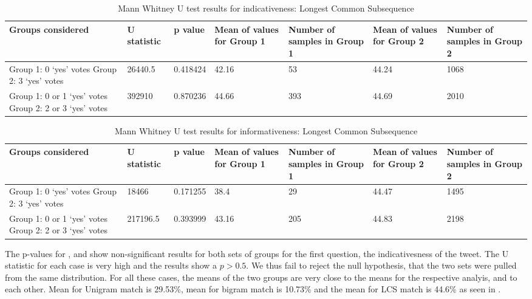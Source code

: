 \begin{table}[!htbp]
\caption{Mann Whitney U test results for indicativeness: Longest Common Subsequence}
\centering
\label{tab:lcscorr1}
\begin{tabular}{|p{}|p{}|p{}|p{}|p{}|p{}|p{}|}
\hline
Groups considered    & U statistic & p value & Mean of values for Group 1 & Number of samples in Group 1 & Mean of values for Group 2 & Number of samples in Group 2\\ \hline
Group 1: 0 `yes' votes \newline Group 2: 3 `yes' votes &  26440.5  &  0.418424  &  42.16  & 53 &  44.24 &   1068  \\ \hline
Group 1: 0 or 1 `yes' votes \newline Group 2: 2 or 3 `yes' votes  &  392910     & 0.870236 &  44.66  & 393 & 44.69 & 2010 \\ \hline
\end{tabular}
\end{table}

\begin{table}[!htbp]
\centering
\caption{Mann Whitney U test results for informativeness: Longest Common Subsequence}
\label{tab:lcscorr2}
\begin{tabular}{|p{}|p{}|p{}|p{}|p{}|p{}|p{}|}
\hline
Groups considered    & U statistic & p value & Mean of values for Group 1 & Number of samples in Group 1 & Mean of values for Group 2 & Number of samples in Group 2\\ \hline
Group 1: 0 `yes' votes \newline Group 2: 3 `yes' votes & 18466   & 0.171255 & 38.4 & 29 & 44.47  & 1495 \\ \hline
Group 1: 0 or 1 `yes' votes \newline Group 2: 2 or 3 `yes' votes & 217196.5      &  0.393999    & 43.16    & 205 & 44.83   &  2198\\ \hline
\end{tabular}
\end{table}

The p-values for ,  and  show non-significant results for both sets of groups for the first question, the indicativesness of the tweet. The U statistic for each case is very high and the results show a $p>0.5$. We thus fail to reject the null hypothesis, that the two sets were pulled from the same distribution. For all these cases, the means of the two groups are very close to the means for the respective analyis, and to each other. Mean for Unigram match is 29.53\%, mean for bigram match is 10.73\% and the mean for LCS match is 44.6\% as seen in . 

